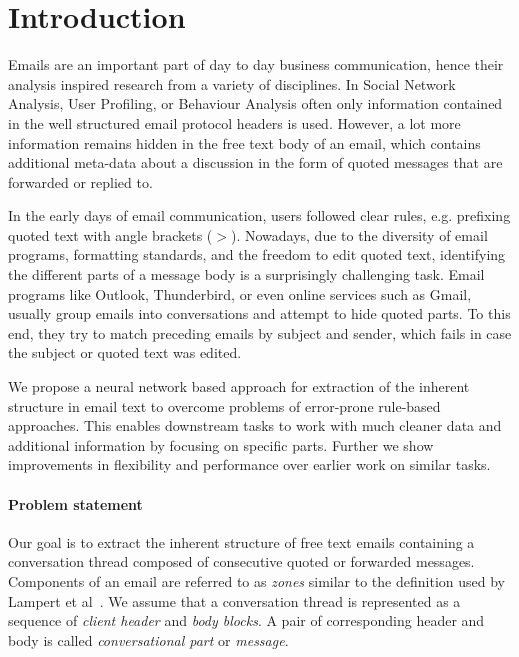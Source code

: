 \documentclass{llncs}
\begin{document}
\section{Introduction}
Emails are an important part of day to day business communication, hence their analysis inspired research from a variety of disciplines.
In Social Network Analysis, User Profiling, or Behaviour Analysis often only information contained in the well structured email protocol headers is used.
However, a lot more information remains hidden in the free text body of an email, which contains additional meta-data about a discussion in the form of quoted messages that are forwarded or replied to.

In the early days of email communication, users followed clear rules, e.g. prefixing quoted text with angle brackets ($>$).
Nowadays, due to the diversity of email programs, formatting standards, and the freedom to edit quoted text, identifying the different parts of a message body is a surprisingly challenging task.
Email programs like Outlook, Thunderbird, or even online services such as Gmail, usually group emails into conversations and attempt to hide quoted parts.
To this end, they try to match preceding emails by subject and sender, which fails in case the subject or quoted text was edited.

We propose a neural network based approach for extraction of the inherent structure in email text to overcome problems of error-prone rule-based approaches.
This enables downstream tasks to work with much cleaner data and additional information by focusing on specific parts.
Further we show improvements in flexibility and performance over earlier work on similar tasks.






\paragraph{Problem statement}
Our goal is to extract the inherent structure of free text emails containing a conversation thread composed of consecutive quoted or forwarded messages.
Components of an email are referred to as \textit{zones} similar to the definition used by Lampert et al~\cite{zones}.
We assume that a conversation thread is represented as a sequence of \textit{client header} and \textit{body blocks}.
A pair of corresponding header and body is called \textit{conversational part} or \textit{message}.
\end{document}
